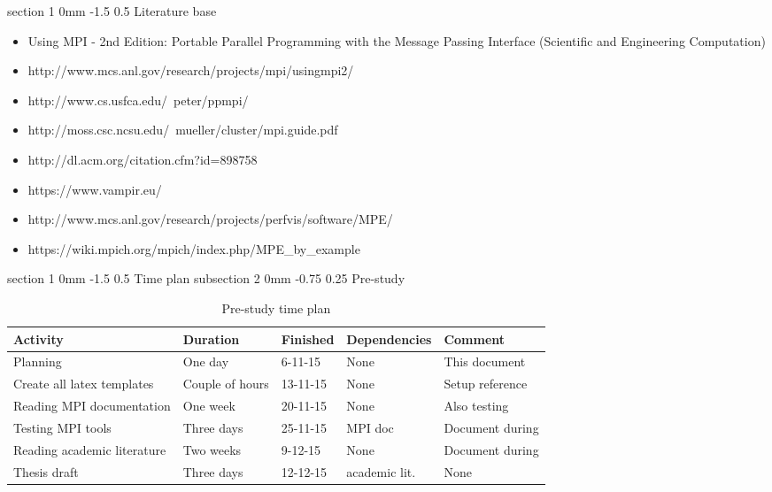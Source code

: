 \documentclass[a4paper,11pt]{article}
\makeatletter
\renewcommand{\section}{\@startsection
   {section}%
   {1}%
   {0mm}%
   {-1.5\baselineskip}%
   {0.5\baselineskip}%
   {\sffamily\bfseries\upshape\normalsize}}%
\renewcommand{\subsection}{\@startsection
   {subsection}%
   {2}%
   {0mm}%
   {-0.75\baselineskip}%
   {0.25\baselineskip}%
   {\rmfamily\normalfont\slshape\normalsize}}%
\makeatother
\begin{document}
\section{Literature base }
\begin{itemize}
\item Using MPI - 2nd Edition: Portable Parallel Programming with the Message Passing Interface (Scientific and Engineering Computation)
\item http://www.mcs.anl.gov/research/projects/mpi/usingmpi2/
\item http://www.cs.usfca.edu/~peter/ppmpi/
\item http://moss.csc.ncsu.edu/~mueller/cluster/mpi.guide.pdf
\item http://dl.acm.org/citation.cfm?id=898758
\item https://www.vampir.eu/
\item http://www.mcs.anl.gov/research/projects/perfvis/software/MPE/
\item https://wiki.mpich.org/mpich/index.php/MPE\_by\_example
\end{itemize}

\section{Time plan}
\subsection{Pre-study}

\begin{table}[H]
  \centering
  \begin{tabular}{|l|l|l|l|l|}
    \hline
    \textbf{Activity} & Duration & Finished & Dependencies & Comment  \\ \hline
    Planning & One day & 6-11-15 & None & This document \\ \hline
    Create all latex templates & Couple of hours & 13-11-15 & None & Setup reference \\ \hline
    Reading MPI documentation & One week & 20-11-15 & None & Also testing \\ \hline
    Testing MPI tools & Three days & 25-11-15 & MPI doc & Document during \\ \hline
	 Reading academic literature & Two weeks & 9-12-15 & None & Document during \\ \hline
   Thesis draft & Three days & 12-12-15 & academic lit. & None \\ \hline
  \end{tabular}
  \caption{Pre-study time plan }
  \label{tab:funktion1}
\end{table}
\end{document}
